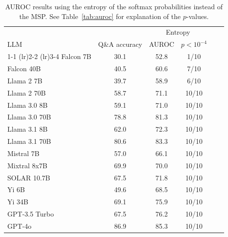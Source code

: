 \begin{table}[h]
\caption{AUROC results using the entropy of the softmax probabilities instead of the MSP. See Table~\ref{tab:auroc} for explanation of the $p$-values.}
\label{tab:auroc_entropy}
\centering
\begin{tabular}{lccccc}
\toprule
& & \multicolumn{2}{c}{Entropy} \\ 
LLM & Q\&A accuracy & AUROC & $p < 10^{-4}$ \\ 
\cmidrule(lr){1-1} \cmidrule(lr){2-2} \cmidrule(lr){3-4}
Falcon 7B & 30.1 & 52.8 & 1/10\\
Falcon 40B & 40.5 & 60.6 & 7/10\\
Llama 2 7B & 39.7 & 58.9 & 6/10\\
Llama 2 70B & 58.7 & 71.1 & 10/10\\
Llama 3.0 8B & 59.1 & 71.0 & 10/10\\
Llama 3.0 70B & 78.8 & 81.3 & 10/10\\
Llama 3.1 8B & 62.0 & 72.3 & 10/10\\
Llama 3.1 70B & 80.6 & 83.3 & 10/10\\
Mistral 7B & 57.0 & 66.1 & 10/10\\
Mixtral 8x7B & 69.9 & 70.0 & 10/10\\
SOLAR 10.7B & 67.5 & 71.8 & 10/10\\
Yi 6B & 49.6 & 68.5 & 10/10\\
Yi 34B & 69.1 & 75.9 & 10/10\\
GPT-3.5 Turbo & 67.5 & 76.2 & 10/10\\
GPT-4o & 86.9 & 85.3 & 10/10\\
\bottomrule
\end{tabular}
\end{table}
